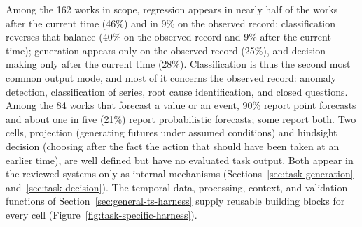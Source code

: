 \documentclass[preprints,article,submit,moreauthors]{Definitions/mdpi}
\begin{document}
Among the 162 works in scope, regression appears in nearly half of the works after the current time (46\%) and in 9\% on the observed record; classification reverses that balance (40\% on the observed record and 9\% after the current time); generation appears only on the observed record (25\%), and decision making only after the current time (28\%). Classification is thus the second most common output mode, and most of it concerns the observed record: anomaly detection, classification of series, root cause identification, and closed questions. Among the 84 works that forecast a value or an event, 90\% report point forecasts and about one in five (21\%) report probabilistic forecasts; some report both. Two cells, projection (generating futures under assumed conditions) and hindsight decision (choosing after the fact the action that should have been taken at an earlier time), are well defined but have no evaluated task output. Both appear in the reviewed systems only as internal mechanisms (Sections~\ref{sec:task-generation} and~\ref{sec:task-decision}). The temporal data, processing, context, and validation functions of Section~\ref{sec:general-ts-harness} supply reusable building blocks for every cell (Figure~\ref{fig:task-specific-harness}).
\end{document}
